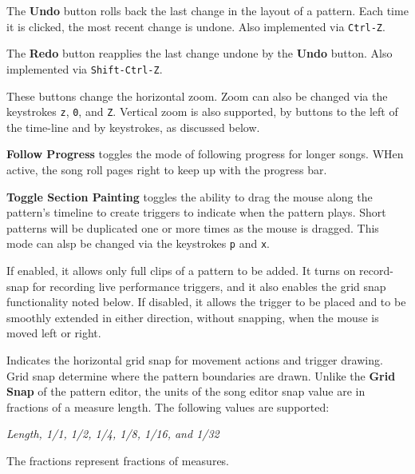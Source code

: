   The \textbf{Undo} button rolls back the last change in the layout of a
   pattern.  Each time it is clicked, the most recent change is undone.
   Also implemented via \texttt{Ctrl-Z}.

   The \textbf{Redo} button reapplies the last change undone by
   the \textbf{Undo} button.
   Also implemented via \texttt{Shift-Ctrl-Z}.

   These buttons change the horizontal zoom.
   Zoom can also be changed via the keystrokes \texttt{z}, \texttt{0},
   and \texttt{Z}.
   Vertical zoom is also supported, by buttons to the left of the time-line and
   by keystrokes, as discussed below.

   \textbf{Follow Progress} toggles the mode of following progress
   for longer songs.  WHen active, the song roll pages right to keep up with
   the progress bar.

   \textbf{Toggle Section Painting} toggles the ability
   to drag the mouse along the pattern's timeline to create triggers
   to indicate when the pattern plays.
   Short patterns will be duplicated one or more times as
   the mouse is dragged.
   This mode can alsp be changed via the keystrokes \texttt{p} and
   \texttt{x}.

   If enabled, it allows only full clips of a pattern to be added.
   It turns on record-snap for recording live performance triggers,
   and it also enables the grid snap functionality noted below.
   If disabled, it allows the trigger to be placed and to be smoothly extended
   in either direction, without snapping, when the mouse is moved left or
   right.

   Indicates the horizontal grid snap for movement actions and trigger drawing.
   Grid snap determine where the pattern boundaries are drawn.
   Unlike the \textbf{Grid Snap} of the pattern editor, the units
   of the song editor snap value are in fractions of a measure length.
   The following values are supported:

   \textsl{Length, 1/1, 1/2, 1/4, 1/8, 1/16, and 1/32}

   The fractions represent fractions of measures.

